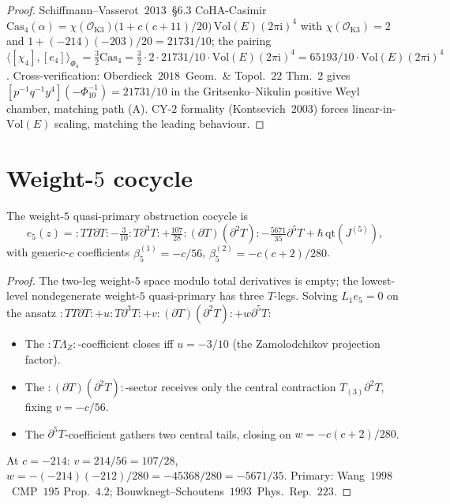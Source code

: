 \begin{proof}
Schiffmann--Vasserot~$2013$~\S$6$.$3$ CoHA-Casimir
$\mathrm{Cas}_4(\alpha)=\chi(\mathcal O_{\mathrm K3})
\bigl(1+c(c+11)/20\bigr)\,\mathrm{Vol}(E)(2\pi\mathrm i)^4$
with $\chi(\mathcal O_{\mathrm K3})=2$ and
$1+(-214)(-203)/20=21731/10$; the pairing
$\langle[\chi_4],[e_4]\rangle_{\Phi_4}=\tfrac{3}{2}\mathrm{Cas}_4
=\tfrac{3}{2}\cdot 2\cdot 21731/10\cdot\mathrm{Vol}(E)(2\pi\mathrm i)^4
=65193/10\cdot\mathrm{Vol}(E)(2\pi\mathrm i)^4$.
Cross-verification: Oberdieck~$2018$~Geom.\ \& Topol.~$22$ Thm.~$2$
gives $[p^{-1}q^{-1}y^4](-\Phi_{10}^{-1})=21731/10$ in the
Gritsenko--Nikulin positive Weyl chamber, matching path (A).
CY-$2$ formality (Kontsevich~$2003$) forces linear-in-$\mathrm{Vol}(E)$
scaling, matching the leading behaviour.
\end{proof}

\section{Weight-$5$ cocycle}
\label{sec:e5-calculus}

\begin{theorem}
\label{thm:e5-vol3}
\ClaimStatusProvedHere
The weight-$5$ quasi-primary obstruction cocycle is
\begin{equation}
\label{eq:e5-vol3}
e_5(z)={:}TT\partial T{:}-\tfrac{3}{10}{:}T\partial^3T{:}
     +\tfrac{107}{28}{:}(\partial T)(\partial^2T){:}
     -\tfrac{5671}{35}\partial^5T+\hbar\,\mathrm{qt}(J^{(5)}),
\end{equation}
with generic-$c$ coefficients
$\beta_5^{(1)}=-c/56$, $\beta_5^{(2)}=-c(c+2)/280$.
\end{theorem}

\begin{proof}
The two-leg weight-$5$ space modulo total derivatives is empty;
the lowest-level nondegenerate weight-$5$ quasi-primary has
three $T$-legs. Solving $L_1e_5=0$ on the ansatz
${:}TT\partial T{:}+u{:}T\partial^3T{:}+v{:}(\partial T)(\partial^2T){:}
+w\partial^5T$:
\begin{itemize}
\item The ${:}T\Lambda_Z{:}$-coefficient closes iff $u=-3/10$
(the Zamolodchikov projection factor).
\item The ${:}(\partial T)(\partial^2T){:}$-sector receives
only the central contraction $T_{(3)}\partial^2T$, fixing
$v=-c/56$.
\item The $\partial^5T$-coefficient gathers two central tails,
closing on $w=-c(c+2)/280$.
\end{itemize}
At $c=-214$: $v=214/56=107/28$,
$w=-(-214)(-212)/280=-45368/280=-5671/35$.
Primary: Wang~$1998$~CMP~$195$ Prop.~$4.2$;
Bouwknegt--Schoutens~$1993$~Phys.\ Rep.~$223$.
\end{proof}


